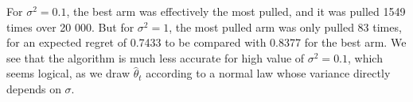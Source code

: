 \documentclass[11pt,a4paper]{article}
\begin{document}
For  $\sigma^2 = 0.1$, the best arm was effectively the most pulled, and it was pulled 1549 times over 20 000. But for $\sigma^2 = 1$, the most pulled arm was only pulled 83 times, for an expected regret of 0.7433 to be compared with 0.8377 for the best arm. We see that the algorithm is much less accurate for high value of $\sigma^2 = 0.1$, which seems logical, as we draw $\widehat{\theta}_t$ according to a normal law whose variance directly depends on $\sigma$. 
\end{document}
